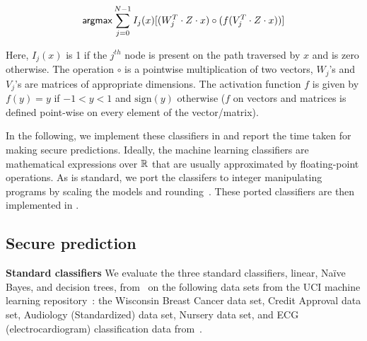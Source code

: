 \[
{\sf argmax} \sum_{j = 0}^{N - 1} I_j(x)[ (W_j^T\cdot Z\cdot x) \circ (f(V_j^T\cdot Z\cdot x))] 
\]

Here, $I_j(x)$ is 1 if the $j^{th}$ node is present on the path traversed by $x$
and is zero otherwise. 
The operation $\circ$ is a pointwise multiplication of two vectors, $W_j$'s and $V_j$'s
are matrices of appropriate dimensions. The activation function $f$ is given by $f(y) = y$ if
$-1 < y < 1$ and $\mathrm{sign}(y)$ otherwise ($f$ on vectors and matrices is defined point-wise on every element of the vector/matrix).

In the following, we implement these classifiers in \tool and report
the time taken for making secure predictions. Ideally, the machine
learning classifiers are mathematical expressions over ${\mathbb{R}}$ that are
usually approximated by floating-point operations. 
As is standard, we port the classifers to integer manipulating
programs by scaling the models and rounding~\cite{minionn}. These
ported classifiers are then implemented in \tool.

\subsection{Secure prediction}
\noindent\textbf{Standard classifiers}
We evaluate the three standard classifiers, linear, Na\"{i}ve Bayes, and
decision trees, from~\cite{shafindss} on the following data sets from the UCI
machine learning repository~\cite{uci}:
 the Wisconsin Breast Cancer data set, 
Credit Approval data set, Audiology (Standardized) data set, Nursery
data set, and ECG (electrocardiogram) classification data
from~\cite{barni}.

